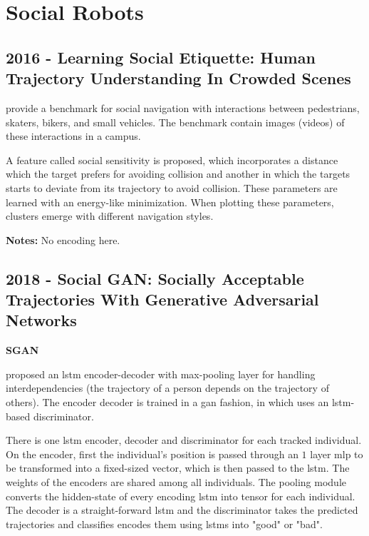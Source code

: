 \section{Social Robots}\label{sec: social robots}

\subsection*{2016 - Learning Social Etiquette: Human Trajectory Understanding In Crowded Scenes}

\cite{robicquet2016learning} provide a benchmark for social navigation with interactions between pedestrians, skaters, bikers, and small vehicles. 
%
The benchmark contain images (videos) of these interactions in a campus.

A feature called social sensitivity is proposed, which incorporates a distance which the target prefers for avoiding collision and another in which the targets starts to deviate from its trajectory to avoid collision.
%
These parameters are learned with an energy-like minimization.
%
When plotting these parameters, clusters emerge with different navigation styles.

\textbf{Notes:} No encoding here. 

\subsection*{2018 - Social GAN: Socially Acceptable Trajectories With Generative Adversarial Networks}

\textbf{SGAN}

\cite{gupta2018social} proposed an \gls{lstm} encoder-decoder with max-pooling layer for handling interdependencies (the trajectory of a person depends on the trajectory of others).
%
The encoder decoder is trained in a \gls{gan} fashion, in which uses an \gls{lstm}-based discriminator.

There is one \gls{lstm} encoder, decoder and discriminator for each tracked individual.
%
On the encoder, first the individual's position is passed through an $1$ layer \gls{mlp} to be transformed into a fixed-sized vector, which is then passed to the \gls{lstm}. The weights of the encoders are shared among all individuals.
%
The pooling module converts the hidden-state of every encoding \gls{lstm} into tensor for each individual.
%
The decoder is a straight-forward \gls{lstm} and the discriminator takes the predicted trajectories and classifies encodes them using \gls{lstms} into "good" or "bad".


